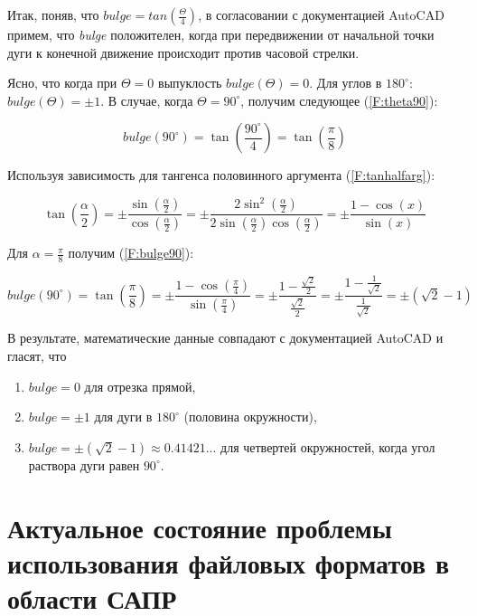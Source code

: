 Итак, поняв, что $bulge = tan(\frac{\Theta}{4})$, в согласовании с документацией AutoCAD \cite{autocad2012dxf} примем, что \textit{bulge} положителен, когда при передвижении от начальной точки дуги к конечной движение происходит против часовой стрелки.

Ясно, что когда при $\Theta=0$ выпуклость $bulge(\Theta)=0$. Для углов в $180^{\circ}$: $bulge(\Theta)=\pm1$. В случае, когда $\Theta=90^{\circ}$, получим следующее (\ref{F:theta90}):

\begin{equation}
	bulge(90^{\circ})= \tan(\frac{90^{\circ}}{4})=\tan(\frac{\pi}{8})
	\label{F:theta90}
\end{equation}

Используя зависимость для тангенса половинного аргумента (\ref{F:tanhalfarg}):

\begin{equation}
	\tan(\frac{\alpha}{2})=\pm\frac{\sin(\frac{\alpha}{2})}{\cos(\frac{\alpha}{2})}=\pm\frac{2\sin^2(\frac{\alpha}{2})}{2\sin(\frac{\alpha}{2})\cos(\frac{\alpha}{2})}=\pm\frac{1-\cos(x)}{\sin(x)}
	\label{F:tanhalfarg}
\end{equation}

Для $\alpha=\frac{\pi}{8}$ получим (\ref{F:bulge90}):

\begin{equation}
	bulge(90^{\circ})=\tan(\frac{\pi}{8})=\pm\frac{1-\cos(\frac{\pi}{4})}{\sin(\frac{\pi}{4})}=\pm\frac{1-\frac{\sqrt2}{2}}{\frac{\sqrt2}{2}}=\pm\frac{1-\frac{1}{\sqrt2}}{\frac{1}{\sqrt2}}=\pm(\sqrt2-1)
	\label{F:bulge90}
\end{equation}



В результате, математические данные совпадают с документацией AutoCAD \cite{autocad2012dxf} и гласят, что

\begin{enumerate}
	\item $bulge = 0$ для отрезка прямой,
	\item $bulge = \pm1$ для дуги в $180^{\circ}$ (половина окружности),
	\item $bulge = \pm(\sqrt2-1) \approx0.41421...$ для четвертей окружностей, когда угол раствора дуги равен $90^{\circ}$.
\end{enumerate}

\section{Актуальное состояние проблемы использования файловых форматов в области САПР} \label{sec:actual}

